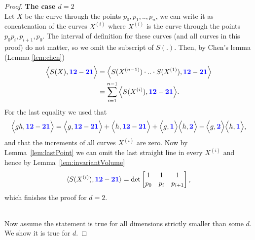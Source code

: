 \documentclass{scrartcl}
\theoremstyle{plain}
\theoremstyle{definition}
\newcommand{\1}[1]{1_{\{#1\}}}
\newcommand{\ds}{d} %
\def\word#1{{\color{blue}\mathbf{#1}}}
\begin{document}
\begin{proof}
  \textbf{The case $\ds=2$}\\
  Let $X$ be the curve through the points $p_0,p_1,..,p_n$,
  we can write it as concatenation
  of the curves $X^{(i)}$ where $X^{(i)}$ is the curve through
  the points $p_0 p_i, p_{i+1}, p_0$.
  The interval of definition for these curves (and all curves
  in this proof) do not matter, so we omit the subscript of $S(.)$.
  Then, by Chen's lemma (Lemma \ref{lem:chen})
  \begin{align*}
    \Big\langle S(X), \word{12} - \word{21} \Big\rangle
    &=
    \Big\langle S(X^{(n-1)}) \cdot .. \cdot S(X^{(1)}), \word{12} - \word{21} \Big\rangle \\
    &=
    \sum_{i=1}^{n-1} \Big\langle S(X^{(i)}), \word{12} - \word{21} \Big\rangle.
  \end{align*}
  For the last equality we used that
  \begin{align*}
    \Big\langle g h, \word{12} - \word{21}\Big\rangle
    =
    \Big\langle g, \word{12} - \word{21}\Big\rangle
    +
    \Big\langle h, \word{12} - \word{21}\Big\rangle
    +
    \Big\langle g, \word{1} \Big\rangle \Big\langle h, \word{2} \Big\rangle
    -
    \Big\langle g, \word{2} \Big\rangle \Big\langle h, \word{1} \Big\rangle,
  \end{align*}
  and that the increments of all curves $X^{(i)}$ are zero.
  Now by Lemma~\ref{lem:lastPoint}
  we can omit the last straight line in every $X^{(i)}$ and hence
  by Lemma~\ref{lem:invariantVolume}
  \begin{align*}
    \langle S(X^{(i)}), \word{12} - \word{21} \rangle
    =
     \det\left[
       \begin{matrix}
         1       & 1   & 1 \\
         p_{0} & p_{i} & p_{i+1}
       \end{matrix}
     \right],
  \end{align*}
  which finishes the proof for $\ds=2$.


  ~\\

  Now assume the statement is true for all dimensions strictly smaller than some $\ds$. We show it is true for $\ds$.


\end{proof}
\end{document}
